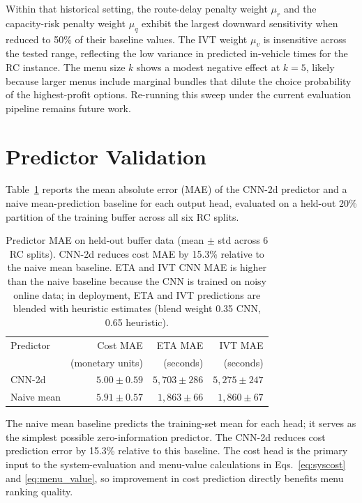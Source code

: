 Within that historical setting, the route-delay penalty weight $\mu_r$ and the capacity-risk penalty weight $\mu_q$ exhibit the largest downward sensitivity when reduced to 50\% of their baseline values. The IVT weight $\mu_v$ is insensitive across the tested range, reflecting the low variance in predicted in-vehicle times for the RC instance. The menu size $k$ shows a modest negative effect at $k=5$, likely because larger menus include marginal bundles that dilute the choice probability of the highest-profit options. Re-running this sweep under the current evaluation pipeline remains future work.

\section{Predictor Validation}
\label{app:predictor_validation}

Table~\ref{tab:predictor_mae} reports the mean absolute error (MAE) of the CNN-2d predictor and a naive mean-prediction baseline for each output head, evaluated on a held-out 20\% partition of the training buffer across all six RC splits.

\begin{table}[h]
\centering
\caption{Predictor MAE on held-out buffer data (mean $\pm$ std across 6 RC splits). CNN-2d reduces cost MAE by 15.3\% relative to the naive mean baseline. ETA and IVT CNN MAE is higher than the naive baseline because the CNN is trained on noisy online data; in deployment, ETA and IVT predictions are blended with heuristic estimates (blend weight 0.35 CNN, 0.65 heuristic).}
\label{tab:predictor_mae}
\begin{tabular}{lrrr}
\hline
Predictor & Cost MAE & ETA MAE & IVT MAE \\
          & (monetary units) & (seconds) & (seconds) \\
\hline
CNN-2d     & $5.00 \pm 0.59$ & $5{,}703 \pm 286$ & $5{,}275 \pm 247$ \\
Naive mean & $5.91 \pm 0.57$ & $1{,}863 \pm 66$  & $1{,}860 \pm 67$  \\
\hline
\end{tabular}
\end{table}

The naive mean baseline predicts the training-set mean for each head; it serves as the simplest possible zero-information predictor. The CNN-2d reduces cost prediction error by 15.3\% relative to this baseline. The cost head is the primary input to the system-evaluation and menu-value calculations in Eqs.~\ref{eq:syscost} and \ref{eq:menu_value}, so improvement in cost prediction directly benefits menu ranking quality.


